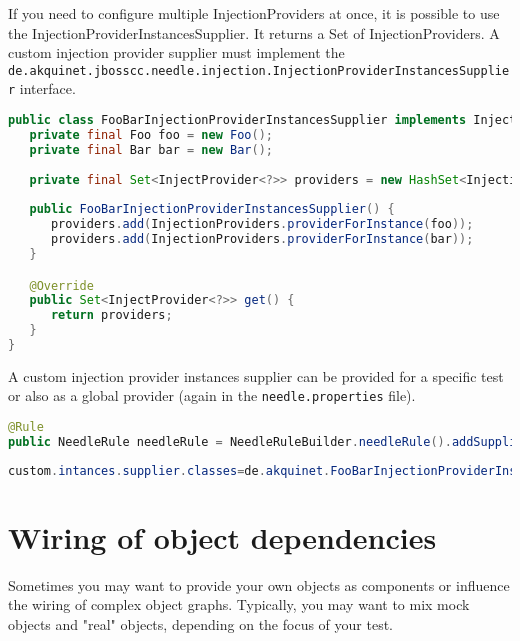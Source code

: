 If you need to configure multiple InjectionProviders at once, it is possible to use the InjectionProviderInstancesSupplier. It returns
a Set of InjectionProviders.
A custom injection provider supplier must implement the \verb|de.akquinet.jbosscc.needle.injection.InjectionProviderInstancesSupplier| interface.

\begin{lstlisting}[language={JAVA},caption=Injection Provider InstancesSupplier]
public class FooBarInjectionProviderInstancesSupplier implements InjectionProviderInstancesSupplier {
   private final Foo foo = new Foo();
   private final Bar bar = new Bar();
   
   private final Set<InjectProvider<?>> providers = new HashSet<InjectionProvider<?>>();
   
   public FooBarInjectionProviderInstancesSupplier() {
      providers.add(InjectionProviders.providerForInstance(foo));
      providers.add(InjectionProviders.providerForInstance(bar));
   }

   @Override
   public Set<InjectProvider<?>> get() {
      return providers;
   }
}
\end{lstlisting}

A custom injection provider instances supplier can be provided for a specific test or also as a global provider (again in the \verb|needle.properties| file).

\begin{lstlisting}[language={JAVA},caption=Custom injection supplier for a specific test]
@Rule
public NeedleRule needleRule = NeedleRuleBuilder.needleRule().addSupplier(new FooBarInjectionProviderInstancesSupplier());
\end{lstlisting}

\begin{lstlisting}[language={JAVA},caption=Global custom injection provider supplier]
custom.intances.supplier.classes=de.akquinet.FooBarInjectionProviderInstancesSupplier
\end{lstlisting}

\section{Wiring of object dependencies}
\label{sec:Wiring of object dependencies}

Sometimes you may want to provide your own objects as components or influence the wiring of complex object graphs. Typically, you may want to mix
mock objects and "real" objects, depending on the focus of your test.

